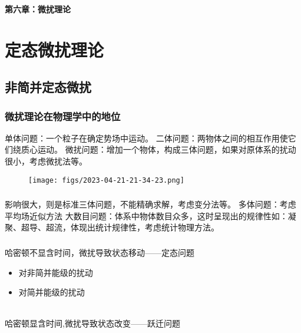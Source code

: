 \begin{frame} [plain]
    \frametitle{}
    \begin{center}
    { {\bf \huge 第六章：微扰理论 }}
    \end{center}  
    \addtocounter{framenumber}{-1}   
\end{frame}

\section{定态微扰理论}

\subsection{非简并定态微扰}
\begin{frame}
  \frametitle{微扰理论在物理学中的地位
  }
  \begin{itemize}
    \Item 单体问题：一个粒子在确定势场中运动。
    \Item 二体问题：两物体之间的相互作用使它们绕质心运动。
    \Item 微扰问题：增加一个物体，构成三体问题，如果对原体系的扰动很小，考虑微扰法等。
  \end{itemize}
  \begin{figure}
    \texttt{[image: figs/2023-04-21-21-34-23.png]}   
\end{figure}
\end{frame} 

\begin{frame} 
  \frametitle{}
  \begin{itemize}
    \Item 影响很大，则是标准三体问题，不能精确求解，考虑变分法等。
    \Item 多体问题：考虑平均场近似方法
    \Item 大数目问题：体系中物体数目众多，这时呈现出的规律性如：凝聚、超导、超流，体现出统计规律性，考虑统计物理方法。
  \end{itemize}
\end{frame} 

\begin{frame}
  \frametitle{}
  \emf[定态微扰:] 哈密顿不显含时间，微扰导致状态移动——定态问题 \\
  \begin{itemize}
    \item 对非简并能级的扰动
    \item 对简并能级的扰动
  \end{itemize}

  ~~\\ 
  \emf[跃迁问题:] 哈密顿显含时间,微扰导致状态改变——跃迁问题 
\end{frame} 

